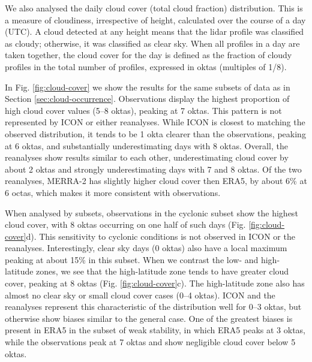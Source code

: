 \documentclass[draft]{agujournal2019}
\begin{document}
We also analysed the daily cloud cover (total cloud fraction) distribution.
This is a measure of cloudiness, irrespective of height, calculated over the
course of a day (UTC). A cloud detected at any height means that the lidar
profile was classified as cloudy; otherwise, it was classified as clear sky.
When all profiles in a day are taken together, the cloud cover for the day is
defined as the fraction of cloudy profiles in the total number of profiles,
expressed in oktas (multiples of 1/8).

In Fig.  \ref{fig:cloud-cover} we show the results for the same subsets of data
as in Section \ref{sec:cloud-occurrence}. Observations display the highest
proportion of high cloud cover values (5--8 oktas), peaking at 7 oktas. This
pattern is not represented by ICON or either reanalyses.  While ICON is closest
to matching the observed distribution, it tends to be 1 okta clearer than the
observations, peaking at 6 oktas, and substantially underestimating days with 8
oktas.  Overall, the reanalyses show results similar to each other,
underestimating cloud cover by about 2 oktas and strongly underestimating days
with 7 and 8 oktas. Of the two reanalyses, MERRA-2 has slightly higher cloud
cover then ERA5, by about 6\% at 6 octas, which makes it more consistent with
observations.

When analysed by subsets, observations in the cyclonic subset show the highest
cloud cover, with 8 oktas occurring on one half of such days (Fig.
\ref{fig:cloud-cover}d).  This sensitivity to cyclonic conditions is not
observed in ICON or the reanalyses. Interestingly, clear sky days (0 oktas)
also have a local maximum peaking at about 15\% in this subset.  When we
contrast the low- and high-latitude zones, we see that the high-latitude zone
tends to have greater cloud cover, peaking at 8 oktas (Fig.
\ref{fig:cloud-cover}c). The high-latitude zone also has almost no clear sky or
small cloud cover cases (0--4 oktas). ICON and the reanalyses represent this
characteristic of the distribution well for 0--3 oktas, but otherwise show
biases similar to the general case. One of the greatest biases is present in
ERA5 in the subset of weak stability, in which ERA5 peaks at 3 oktas, while the
observations peak at 7 oktas and show negligible cloud cover below 5 oktas.
\end{document}
